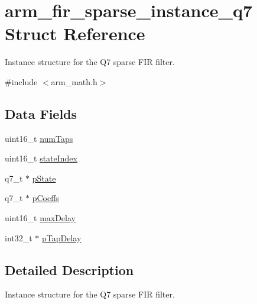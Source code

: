 \hypertarget{structarm__fir__sparse__instance__q7}{\section{arm\-\_\-fir\-\_\-sparse\-\_\-instance\-\_\-q7 Struct Reference}
\label{structarm__fir__sparse__instance__q7}
}


Instance structure for the Q7 sparse F\-I\-R filter.  




{\ttfamily \#include $<$arm\-\_\-math.\-h$>$}

\subsection*{Data Fields}
\begin{DoxyCompactItemize}
\item 
uint16\-\_\-t \hyperlink{structarm__fir__sparse__instance__q7_a751941891e47f522a7f5375fe8990aac}{num\-Taps}
\item 
uint16\-\_\-t \hyperlink{structarm__fir__sparse__instance__q7_a566a0cb53437e48b9a3bf18e5b03d8aa}{state\-Index}
\item 
q7\-\_\-t $\ast$ \hyperlink{structarm__fir__sparse__instance__q7_aa8f67102521b620af6f259afdcf29785}{p\-State}
\item 
q7\-\_\-t $\ast$ \hyperlink{structarm__fir__sparse__instance__q7_a54407554b4fe7bbbb43924e4eea45e7f}{p\-Coeffs}
\item 
uint16\-\_\-t \hyperlink{structarm__fir__sparse__instance__q7_ab25f4ee7550e6d92acff77ada283733f}{max\-Delay}
\item 
int32\-\_\-t $\ast$ \hyperlink{structarm__fir__sparse__instance__q7_adec00b3793ab4f08edfeb4ea6a9eb6e6}{p\-Tap\-Delay}
\end{DoxyCompactItemize}


\subsection{Detailed Description}
Instance structure for the Q7 sparse F\-I\-R filter. 


